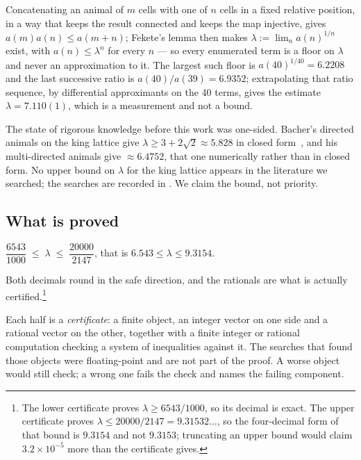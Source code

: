 \documentclass[11pt]{article}
\begin{document}
Concatenating an animal of $m$ cells with one of $n$ cells in a fixed relative
position, in a way that keeps the result connected and keeps the map injective,
gives $a(m)a(n) \le a(m+n)$; Fekete's lemma then makes
$\lambda := \lim_n a(n)^{1/n}$ exist, with $a(n) \le \lambda^n$ for every $n$ ---
so every enumerated term is a floor on $\lambda$ and never an approximation to
it. The largest such floor is $a(40)^{1/40} = 6.2208$ and the last successive
ratio is $a(40)/a(39) = 6.9352$; extrapolating that ratio sequence, by
differential approximants on the 40 terms, gives the estimate
$\lambda = 7.110(1)$, which is a measurement and not a bound.

The state of rigorous knowledge before this work was one-sided. Bacher's directed
animals on the king lattice give $\lambda \ge 3 + 2\sqrt2 \approx 5.828$ in closed
form~\cite{bacher2015}, and his multi-directed animals give $\approx 6.4752$,
that one numerically rather than in closed form. No upper bound on $\lambda$ for
the king lattice appears in the literature we searched; the searches are
recorded in . We claim the bound, not priority.

\subsection{What is proved}

\begin{theorem}
\label{thm:main}
$\dfrac{6543}{1000} \;\le\; \lambda \;\le\; \dfrac{20000}{2147}$, that is
$6.543 \le \lambda \le 9.3154$.
\end{theorem}

Both decimals round in the safe direction, and the rationals are what is
actually certified.\footnote{The lower certificate proves
$\lambda \ge 6543/1000$, so its decimal is exact. The upper certificate proves
$\lambda \le 20000/2147 = 9.31532\dots$, so the four-decimal form of that bound
is $9.3154$ and not $9.3153$; truncating an upper bound would claim
$3.2\times10^{-5}$ more than the certificate gives.}

Each half is a \emph{certificate}: a finite object, an integer vector on one
side and a rational vector on the other, together with a finite integer or
rational computation checking a system of inequalities against it. The searches
that found those objects were floating-point and are not part of the proof. A
worse object would still check; a wrong one fails the check and names the
failing component.
\end{document}
